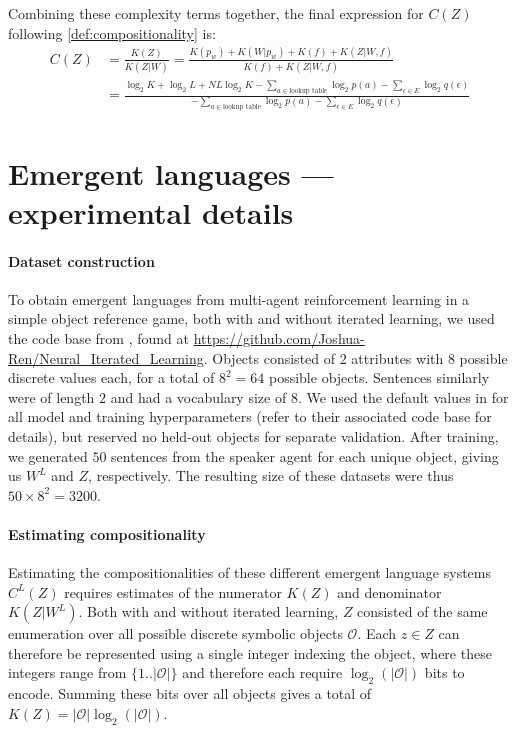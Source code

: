 \documentclass{article}
\begin{document}
\begin{appendices}
Combining these complexity terms together, the final expression for $C(Z)$ following \cref{def:compositionality} is:
\begin{align*}
    C(Z) &= \frac{K(Z)}{K(Z|W)} = \frac{K(p_w) + K(W|p_w) + K(f) + K(Z|W,f)}{K(f) + K(Z|W,f)} \\
    &=
    \frac{\log_2 K + \log_2 L + NL\log_2 K - \sum_{a \in \text{lookup table}} \log_2 p(a) - \sum_{\epsilon \in E} \log_2 q(\epsilon)}{-\sum_{a \in \text{lookup table}} \log_2 p(a) - \sum_{\epsilon \in E} \log_2 q(\epsilon)}
\end{align*}


\section{Emergent languages --- experimental details}
\label{sec:emergent_details}

\paragraph{Dataset construction}

To obtain emergent languages from multi-agent reinforcement learning in a simple object reference game, both with and without iterated learning, we used the code base from \citet{ren2020compositional}, found at \url{https://github.com/Joshua-Ren/Neural_Iterated_Learning}. Objects consisted of $2$ attributes with $8$ possible discrete values each, for a total of $8^2 = 64$ possible objects. Sentences similarly were of length $2$ and had a vocabulary size of $8$. We used the default values in \citet{ren2020compositional} for all model and training hyperparameters (refer to their associated code base for details), but reserved no held-out objects for separate validation. After training, we generated $50$ sentences from the speaker agent for each unique object, giving us $W^L$ and $Z$, respectively. The resulting size of these datasets were thus $50 \times 8^2 = 3200$.

\paragraph{Estimating compositionality}

Estimating the compositionalities of these different emergent language systems $C^L(Z)$ requires estimates of the numerator $K(Z)$ and denominator $K(Z|W^L)$. Both with and without iterated learning, $Z$ consisted of the same enumeration over all possible discrete symbolic objects $\mathcal{O}$. Each $z \in Z$ can therefore be represented using a single integer indexing the object, where these integers range from $\{1..|\mathcal{O}|\}$ and therefore each require $\log_2 (|\mathcal{O}|)$ bits to encode. Summing these bits over all objects gives a total of $K(Z) = |\mathcal{O}| \log_2 (|\mathcal{O}|)$.


\end{appendices}
\end{document}
